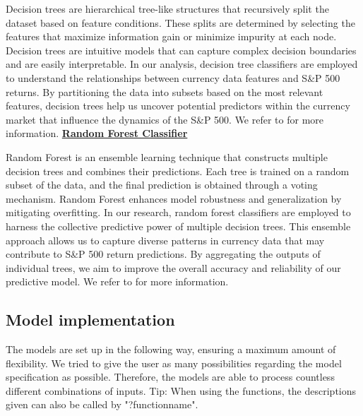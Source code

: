 \noindent Decision trees are hierarchical tree-like structures that recursively split the dataset based on feature conditions. These splits are determined by selecting the features that maximize information gain or minimize impurity at each node. Decision trees are intuitive models that can capture complex decision boundaries and are easily interpretable. In our analysis, decision tree classifiers are employed to understand the relationships between currency data features and S\&P 500 returns. By partitioning the data into subsets based on the most relevant features, decision trees help us uncover potential predictors within the currency market that influence the dynamics of the S\&P 500. We refer to \cite{leobreiman} for more information.
\newline
\newline
\underline{\textbf{Random Forest Classifier}}

\noindent Random Forest is an ensemble learning technique that constructs multiple decision trees and combines their predictions. Each tree is trained on a random subset of the data, and the final prediction is obtained through a voting mechanism. Random Forest enhances model robustness and generalization by mitigating overfitting. In our research, random forest classifiers are employed to harness the collective predictive power of multiple decision trees. This ensemble approach allows us to capture diverse patterns in currency data that may contribute to S\&P 500 return predictions. By aggregating the outputs of individual trees, we aim to improve the overall accuracy and reliability of our predictive model. We refer to \cite{tinkamho} for more information.

\subsection{Model implementation}
The models are set up in the following way, ensuring a maximum amount of flexibility. We tried to give the user as many possibilities regarding the model specification as possible. Therefore, the models are able to process countless different combinations of inputs. Tip: When using the functions, the descriptions given can also be called by "?functionname".

